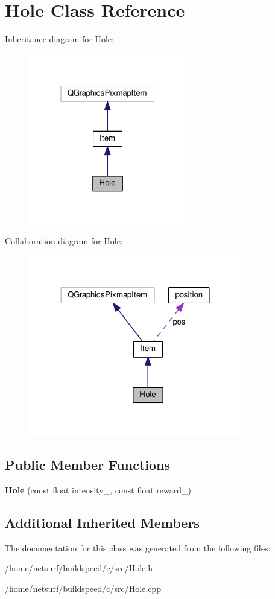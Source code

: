 \hypertarget{class_hole}{}\section{Hole Class Reference}
\label{class_hole}


Inheritance diagram for Hole\+:
\nopagebreak
\begin{figure}[H]
\begin{center}
\leavevmode
\includegraphics[width=196pt]{class_hole__inherit__graph}
\end{center}
\end{figure}


Collaboration diagram for Hole\+:
\nopagebreak
\begin{figure}[H]
\begin{center}
\leavevmode
\includegraphics[width=264pt]{class_hole__coll__graph}
\end{center}
\end{figure}
\subsection*{Public Member Functions}
\begin{DoxyCompactItemize}
\item 
{\bfseries Hole} (const float intensity\+\_\+, const float reward\+\_\+)\hypertarget{class_hole_abe1a64c7a1c55a7da8fd489d02ea2bc8}{}\label{class_hole_abe1a64c7a1c55a7da8fd489d02ea2bc8}

\end{DoxyCompactItemize}
\subsection*{Additional Inherited Members}


The documentation for this class was generated from the following files\+:\begin{DoxyCompactItemize}
\item 
/home/netsurf/buildspeed/c/src/Hole.\+h\item 
/home/netsurf/buildspeed/c/src/Hole.\+cpp\end{DoxyCompactItemize}
